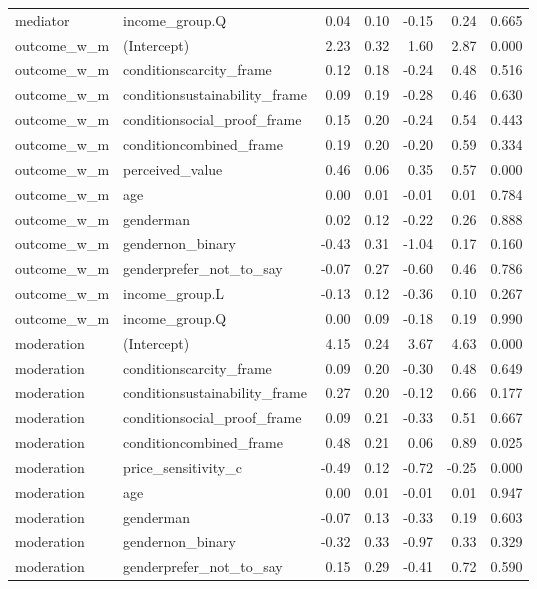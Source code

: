 \begin{table}
\begin{tabular}[t]{llrrrrr}
mediator & income\_group.Q & 0.04 & 0.10 & -0.15 & 0.24 & 0.665\\
outcome\_w\_m & (Intercept) & 2.23 & 0.32 & 1.60 & 2.87 & 0.000\\
outcome\_w\_m & conditionscarcity\_frame & 0.12 & 0.18 & -0.24 & 0.48 & 0.516\\
outcome\_w\_m & conditionsustainability\_frame & 0.09 & 0.19 & -0.28 & 0.46 & 0.630\\
\addlinespace
outcome\_w\_m & conditionsocial\_proof\_frame & 0.15 & 0.20 & -0.24 & 0.54 & 0.443\\
outcome\_w\_m & conditioncombined\_frame & 0.19 & 0.20 & -0.20 & 0.59 & 0.334\\
outcome\_w\_m & perceived\_value & 0.46 & 0.06 & 0.35 & 0.57 & 0.000\\
outcome\_w\_m & age & 0.00 & 0.01 & -0.01 & 0.01 & 0.784\\
outcome\_w\_m & genderman & 0.02 & 0.12 & -0.22 & 0.26 & 0.888\\
\addlinespace
outcome\_w\_m & gendernon\_binary & -0.43 & 0.31 & -1.04 & 0.17 & 0.160\\
outcome\_w\_m & genderprefer\_not\_to\_say & -0.07 & 0.27 & -0.60 & 0.46 & 0.786\\
outcome\_w\_m & income\_group.L & -0.13 & 0.12 & -0.36 & 0.10 & 0.267\\
outcome\_w\_m & income\_group.Q & 0.00 & 0.09 & -0.18 & 0.19 & 0.990\\
moderation & (Intercept) & 4.15 & 0.24 & 3.67 & 4.63 & 0.000\\
\addlinespace
moderation & conditionscarcity\_frame & 0.09 & 0.20 & -0.30 & 0.48 & 0.649\\
moderation & conditionsustainability\_frame & 0.27 & 0.20 & -0.12 & 0.66 & 0.177\\
moderation & conditionsocial\_proof\_frame & 0.09 & 0.21 & -0.33 & 0.51 & 0.667\\
moderation & conditioncombined\_frame & 0.48 & 0.21 & 0.06 & 0.89 & 0.025\\
moderation & price\_sensitivity\_c & -0.49 & 0.12 & -0.72 & -0.25 & 0.000\\
\addlinespace
moderation & age & 0.00 & 0.01 & -0.01 & 0.01 & 0.947\\
moderation & genderman & -0.07 & 0.13 & -0.33 & 0.19 & 0.603\\
moderation & gendernon\_binary & -0.32 & 0.33 & -0.97 & 0.33 & 0.329\\
moderation & genderprefer\_not\_to\_say & 0.15 & 0.29 & -0.41 & 0.72 & 0.590\\

\end{tabular}
\end{table}
